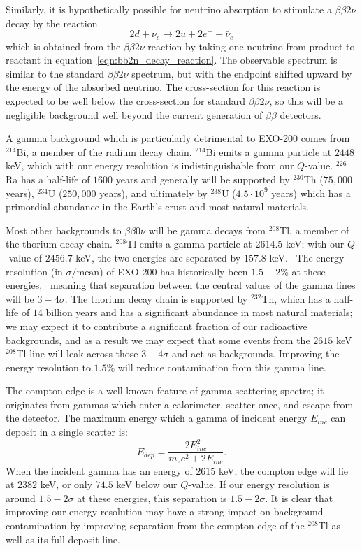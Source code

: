 Similarly, it is hypothetically possible for neutrino absorption to stimulate a $\beta\beta 2\nu$ decay by the reaction
\begin{equation}
2d + \nu_e \rightarrow 2u + 2e^- + \bar{\nu}_e
\end{equation}
which is obtained from the $\beta\beta 2\nu$ reaction by taking one neutrino from product to reactant in equation~\ref{eqn:bb2n_decay_reaction}.  The observable spectrum is similar to the standard $\beta\beta 2\nu$ spectrum, but with the endpoint shifted upward by the energy of the absorbed neutrino.  The cross-section for this reaction is expected to be well below the cross-section for standard $\beta\beta 2\nu$, so this will be a negligible background well beyond the current generation of $\beta\beta$ detectors.

A gamma background which is particularly detrimental to EXO-200 comes from $^{214}$Bi, a member of the radium decay chain.  $^{214}$Bi emits a gamma particle at $2448$ keV, which with our energy resolution is indistinguishable from our $Q$-value.   $^{226}$Ra has a half-life of $1600$ years and generally will be supported by $^{230}$Th ($75,000$ years), $^{234}$U ($250,000$ years), and ultimately by $^{238}$U ($4.5 \cdot 10^9$ years) which has a primordial abundance in the Earth's crust and most natural materials.~\cite{ENSDF}

Most other backgrounds to $\beta\beta 0\nu$ will be gamma decays from $^{208}$Tl, a member of the thorium decay chain.  $^{208}$Tl emits a gamma particle at $2614.5$ keV; with our $Q$-value of $2456.7$ keV, the two energies are separated by $157.8$ keV.~\cite{ENSDF}  The energy resolution (in $\sigma/\text{mean}$) of EXO-200 has historically been $1.5-2\%$ at these energies,~\cite{NewEXObb0nPaper_2014} meaning that separation between the central values of the gamma lines will be $3-4\sigma$.  The thorium decay chain is supported by $^{232}$Th, which has a half-life of $14$ billion years and has a significant abundance in most natural materials; we may expect it to contribute a significant fraction of our radioactive backgrounds, and as a result we may expect that some events from the $2615$ keV $^{208}$Tl line will leak across those $3-4\sigma$ and act as backgrounds.  Improving the energy resolution to $1.5\%$ will reduce contamination from this gamma line.

The compton edge is a well-known feature of gamma scattering spectra; it originates from gammas which enter a calorimeter, scatter once, and escape from the detector.  The maximum energy which a gamma of incident energy $E_{inc}$ can deposit in a single scatter is:~\cite{Compton}
\begin{equation}
E_{dep} = \frac{2E_{inc}^2}{m_e c^2 + 2E_{inc}}.
\end{equation}
When the incident gamma has an energy of $2615$ keV, the compton edge will lie at $2382$ keV, or only $74.5$ keV below our $Q$-value.  If our energy resolution is around $1.5-2\sigma$ at these energies, this separation is $1.5-2\sigma$.  It is clear that improving our energy resolution may have a strong impact on background contamination by improving separation from the compton edge of the $^{208}$Tl as well as its full deposit line.

